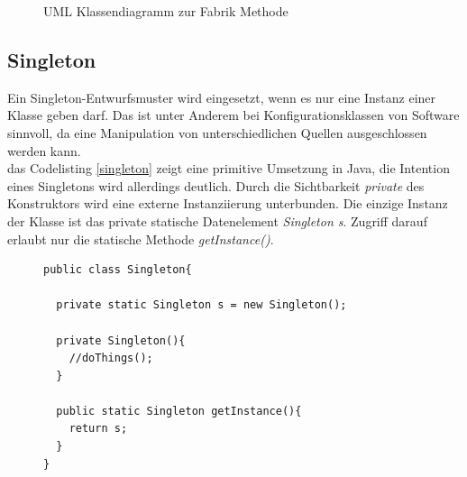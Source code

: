 \begin{figure}[htbp]
  \vspace{0.5cm}
  \centering
   \caption{UML Klassendiagramm zur Fabrik Methode}
  \label{factorymethod}
  \vspace{0.5cm}
\end{figure}

\subsection{Singleton}

Ein Singleton-Entwurfsmuster wird eingesetzt, wenn es nur eine Instanz einer Klasse geben darf\cite[3.4]{starke:swa}. Das ist unter Anderem bei Konfigurationsklassen von Software sinnvoll, da eine Manipulation von unterschiedlichen Quellen ausgeschlossen werden kann.\\
das Codelisting \ref{singleton} zeigt eine primitive Umsetzung in Java, die Intention eines Singletons wird allerdings deutlich. Durch die Sichtbarkeit \textit{private} des Konstruktors wird eine externe Instanziierung unterbunden. Die einzige Instanz der Klasse ist das private statische Datenelement \textit{Singleton s}. Zugriff darauf erlaubt nur die statische Methode \textit{getInstance()}.

\begin{figure}[htbp]
\begin{lstlisting}[frame=leftline]
public class Singleton{
		
  private static Singleton s = new Singleton();
		  
  private Singleton(){
    //doThings();
  }
		  
  public static Singleton getInstance(){
    return s;
  }
}
\end{lstlisting}

\end{figure}

